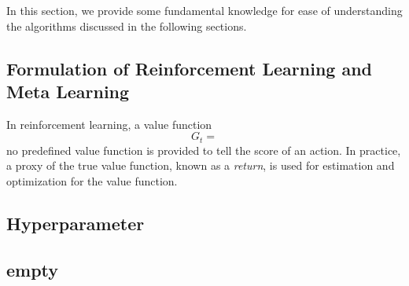 In this section, we provide some fundamental knowledge for ease of understanding the algorithms discussed in the following sections.
\subsection{Formulation of Reinforcement Learning and Meta Learning}
In reinforcement learning, a value function \[G_t = \]
no predefined value function is provided to tell the score of an action. In practice, a proxy of the true value function, known as a \textit{return},  is used for estimation and optimization for the value function. 
\subsection{Hyperparameter}
\subsection{empty}
